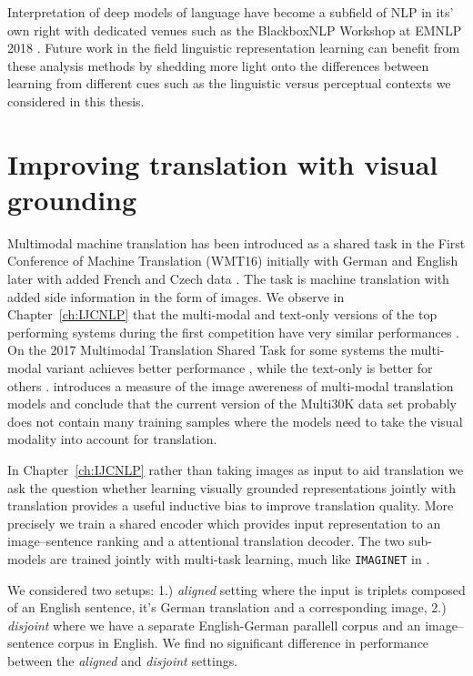 Interpretation of deep models of language have become a subfield of NLP in its' own right
with dedicated venues such as the BlackboxNLP Workshop at EMNLP 2018
\citep{alishahi2019analyzing}. Future work in the field linguistic representation learning
can benefit from these analysis methods by shedding more light onto the differences between
learning from different cues such as the linguistic versus perceptual contexts we considered in 
this thesis.



\section{Improving translation with visual grounding}

Multimodal machine translation has been introduced as a shared task \citep{specia2016shared} in the
First Conference of Machine Translation (WMT16) initially with German and English  \citep{elliott2016multi30k}
later with added French and Czech data \citep{elliott2017findings,barrault2018findings}. The task is 
machine translation with added side information in the form of images. 
We observe in Chapter~\ref{ch:IJCNLP} that the multi-modal and text-only versions of 
the top performing systems during the first competition
have very similar performances \citep{specia2016observed}.
On the 2017 Multimodal Translation Shared Task for some
systems the multi-modal variant achieves better performance
\citep{caglayan2017lium}, while the text-only is better for others \citep{ma2017osu}. 
\cite{elliott2018adversarial} introduces
a measure of the image awereness of multi-modal translation models and conclude that the current 
version of the Multi30K data set probably does not contain many training samples where the models 
need to take the visual modality into account for translation.

In Chapter~\ref{ch:IJCNLP} rather than taking images as input to aid translation we 
ask the question whether learning visually grounded representations jointly with translation
provides a useful inductive bias to improve translation quality. More precisely we train a shared
encoder which provides input representation to an image--sentence ranking and a
attentional translation decoder. The two sub-models are trained jointly with multi-task learning, much
like \texttt{IMAGINET} in \cite{chrupala2015learning}.

We considered two setups:
1.) \emph{aligned} setting where the input is triplets composed of an English sentence, 
it's German translation and a corresponding image, 2.) \emph{disjoint} where we have a
separate English-German parallell corpus and an image--sentence corpus in English.
We find no significant difference in performance between the \emph{aligned} and \emph{disjoint}
settings. 

